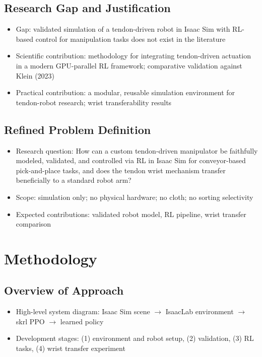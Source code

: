 \section{Research Gap and Justification}
\begin{itemize}
    \item Gap: validated simulation of a tendon-driven robot in Isaac Sim with RL-based control for manipulation tasks does not exist in the literature
    \item Scientific contribution: methodology for integrating tendon-driven actuation in a modern GPU-parallel RL framework; comparative validation against Klein (2023)
    \item Practical contribution: a modular, reusable simulation environment for tendon-robot research; wrist transferability results
\end{itemize}

\section{Refined Problem Definition}
\begin{itemize}
    \item Research question: How can a custom tendon-driven manipulator be faithfully modeled, validated, and controlled via RL in Isaac Sim for conveyor-based pick-and-place tasks, and does the tendon wrist mechanism transfer beneficially to a standard robot arm?
    \item Scope: simulation only; no physical hardware; no cloth; no sorting selectivity
    \item Expected contributions: validated robot model, RL pipeline, wrist transfer comparison
\end{itemize}

\chapter{Methodology}\label{ch:methodology}

\section{Overview of Approach}
\begin{itemize}
    \item High-level system diagram: Isaac Sim scene $\rightarrow$ IsaacLab environment $\rightarrow$ skrl PPO $\rightarrow$ learned policy
    \item Development stages: (1) environment and robot setup, (2) validation, (3) RL tasks, (4) wrist transfer experiment
\end{itemize}

